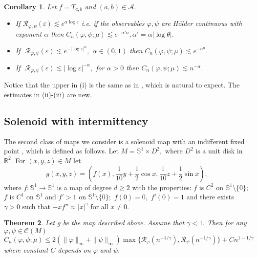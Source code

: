 \documentclass[a4paper,12pt]{amsart}
\numberwithin{equation}{section}
\newtheorem{theorem}{Theorem}[section]\newtheorem{lemma}[theorem]{Lemma}
\newtheorem{corollary}[theorem]{Corollary}
\begin{document}
\begin{corollary}\label{hen}
Let $f=T_{a,b}$ and $(a, b)\in\mathcal A.$
\begin{itemize}
\item[(i)]If $\mathcal R_{\varphi, \psi}(\varepsilon)\lesssim
e^{\alpha\log\varepsilon}$ i.e. if the observables $\varphi, \psi$
are H\"older continuous with exponent $\alpha$ then $C_n(\varphi,
\psi; \mu)\lesssim e^{-{\alpha' n}},$$\alpha'=\alpha|\log\theta|.$
\item[(ii)] If\,\, $\mathcal R_{\varphi, \psi}(\varepsilon)\lesssim e^{-|\log
\varepsilon|^{\alpha}},$ $\alpha\in(0, 1)$  then $C_n(\varphi, \psi;
\mu)\lesssim e^{-n^\alpha}.$
\item[(iii)] If\,\, $\mathcal R_{\varphi, \psi}(\varepsilon)\lesssim |\log
\varepsilon|^{-\alpha},$ for $\alpha>0$  then $C_n(\varphi, \psi;
\mu)\lesssim {n^{-\alpha}}.$
\end{itemize}
\end{corollary}
Notice that the upper in (i) is the same as in \cite{BY2}, which is
natural to expect. The estimates in (ii)-(iii) are new.
\subsection{Solenoid with intermittency}
The second class of maps we consider is a solenoid map with an
indifferent fixed point  \cite{AlvPin}, which is defined  as
follows. Let $M=\mathbb S^1\times D^2,$ where $D^2$ is a unit disk
in $\mathbb R^2.$ For $(x, y, z)\in M$ let
$$g(x, y, z)=\left(f(x), \frac{1}{10}y+\frac{1}{2}\cos x,
\frac{1}{10}z+\frac 1 2\sin x\right),$$
where $f:\mathbb S^1\to
\mathbb S^1$ is a map of degree $d\ge 2$ with the properties: $f$ is
$C^2$ on $\mathbb S^{1}\setminus \{0\};$ $f$ is $C^1$ on $\mathbb
S^1$ and $f'>1$ on $\mathbb S^1\setminus \{0\};$ $f(0)=0,$ $f'(0)=1$
and there exists $\gamma>0$ such that $-xf''\approx |x|^\gamma$ for
all $x\neq 0.$

\begin{theorem}\label{main1} Let $g$ be the map described above.
Assume that $\gamma<1.$ Then for any $\varphi,\psi \in \mathcal
C(M)$
 \begin{equation} \label{bound1} C_n(\varphi, \psi;
\mu)\le 2(\|\varphi\|_\infty+\|\psi\|_\infty)\max\{\mathcal
R_\varphi(n^{-1/\gamma}), \mathcal
R_\psi(n^{-1/\gamma})\}+Cn^{1-1/\gamma}
 \end{equation}
where constant $C$ depends on $\varphi$ and $\psi.$
\end{theorem}
\end{document}
